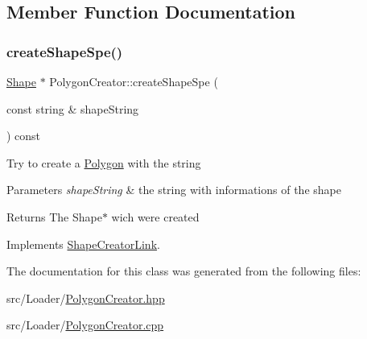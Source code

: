 \subsection{Member Function Documentation}
\hypertarget{class_polygon_creator_ad7a34580d4291a50fe189c912c7b32a0}{}\label{class_polygon_creator_ad7a34580d4291a50fe189c912c7b32a0} 
\subsubsection{\texorpdfstring{create\+Shape\+Spe()}{createShapeSpe()}}
{\footnotesize\ttfamily \hyperlink{class_shape}{Shape} $\ast$ Polygon\+Creator\+::create\+Shape\+Spe (\begin{DoxyParamCaption}\item[{const string \&}]{shape\+String }\end{DoxyParamCaption}) const\hspace{0.3cm}{\ttfamily [virtual]}}

Try to create a \hyperlink{class_polygon}{Polygon} with the string 
\begin{DoxyParams}{Parameters}
{\em shape\+String} & the string with informations of the shape \\
\hline
\end{DoxyParams}
\begin{DoxyReturn}{Returns}
The Shape$\ast$ wich were created 
\end{DoxyReturn}


Implements \hyperlink{class_shape_creator_link_a036ecc845946d23b36335e9077308bcf}{Shape\+Creator\+Link}.



The documentation for this class was generated from the following files\+:\begin{DoxyCompactItemize}
\item 
src/\+Loader/\hyperlink{_polygon_creator_8hpp}{Polygon\+Creator.\+hpp}\item 
src/\+Loader/\hyperlink{_polygon_creator_8cpp}{Polygon\+Creator.\+cpp}\end{DoxyCompactItemize}
